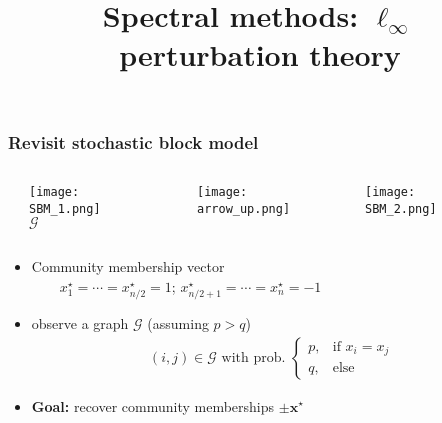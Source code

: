 \documentclass[compress,
mathserif,wide,%
]{beamer}
\title %
{Spectral methods: $\ell_{\infty}$ perturbation theory}
\begin{document}
\begin{frame}[plain]
  \titlepage

\end{frame}








\begin{frame}
	\frametitle{Revisit stochastic block model}

\vspace{-1em}


\begin{columns}

\begin{column}{0.05\textwidth}
\end{column}


\begin{column}{0.25\textwidth}
\begin{center}
  \texttt{[image: SBM\_1.png]} \\
	$\mathcal{G}$
\end{center}
\end{column}

\begin{column}{0.05\textwidth}
\end{column}


\begin{column}{0.12\textwidth}
\begin{center}
\texttt{[image: arrow\_up.png]} 
\end{center}
\end{column}


\begin{column}{0.5\textwidth}
\begin{center}
  \texttt{[image: SBM\_2.png]}
\end{center}
\end{column}

\begin{column}{0.03\textwidth}
\end{column}

\end{columns}


\bigskip


\begin{itemize}
	\itemsep0.5em
	\item Community membership vector \\
	$\qquad x_1^{\star}=\cdots=x_{n/2}^{\star}=1$; $x_{n/2+1}^{\star}=\cdots=x_n^{\star}=-1$ 
	\item observe a graph $\mathcal{G}$ (assuming $p>q$)
		\vspace{-0.5em}
		\begin{align*}
			(i,j)\in \mathcal{G} \text{ with prob.~} \begin{cases} p,  & \text{if }x_i = x_j \\ q, & \text{else} \end{cases}
		\end{align*}
	\item {\bf Goal:}  recover community memberships $\pm \bm{x}^\star$ 
\end{itemize}


\end{frame}
\end{document}
